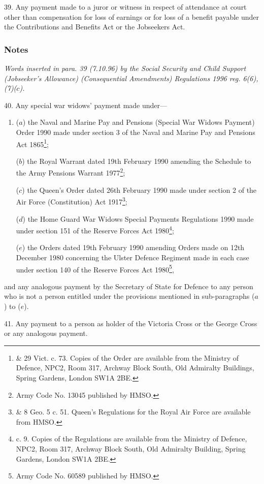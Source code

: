 \documentclass[a4paper]{article}
\newcommand\amendment[1]{\subsubsection*{Notes}{\itshape\frenchspacing\footnotesize #1 \par\goodbreak}}
\begin{document}
39.  Any payment made to a juror or witness in respect of attendance at court other than compensation for loss of earnings or for loss of a benefit payable under the Contributions and Benefits Act
or the Jobseekers Act.  %

\amendment{
Words inserted in para. 39 (7.10.96) by the Social Security and Child Support (Jobseeker's Allowance) (Consequential Amendments) Regulations 1996 reg. 6(6), (7)($c$).
}

\medskip

40.  Any special war widows' payment made under—
\begin{enumerate}\item[]
($a$) the Naval and Marine Pay and Pensions (Special War Widows Payment) Order 1990 made under section 3 of the Naval and Marine Pay and Pensions Act 1865\footnote{ \& 29 Vict. c. 73. Copies of the Order are available from the Ministry of Defence, NPC2, Room 317, Archway Block South, Old Admiralty Buildings, Spring Gardens, London SW1A 2BE.};

($b$) the Royal Warrant dated 19th February 1990 amending the Schedule to the Army Pensions Warrant 1977\footnote{\frenchspacing Army Code No. 13045 published by HMSO.};

($c$) the Queen’s Order dated 26th February 1990 made under section 2 of the Air Force (Constitution) Act 1917\footnote{ \& 8 Geo. 5 c. 51. Queen’s Regulations for the Royal Air Force are available from HMSO.};

($d$) the Home Guard War Widows Special Payments Regulations 1990 made under section 151 of the Reserve Forces Act 1980\footnote{ c. 9. Copies of the Regulations are available from the Ministry of Defence, NPC2, Room 317, Archway Block South, Old Admiralty Building, Spring Gardens, London SW1A 2BE.};

($e$) the Orders dated 19th February 1990 amending Orders made on 12th December 1980 concerning the Ulster Defence Regiment made in each case under section 140 of the Reserve Forces Act 1980\footnote{\frenchspacing Army Code No. 60589 published by HMSO.},
\end{enumerate}
and any analogous payment by the Secretary of State for Defence to any person who is not a person entitled under the provisions mentioned in sub-paragraphs ($a$) to ($e$).

\medskip

41.  Any payment to a person as holder of the Victoria Cross or the George Cross or any analogous payment.
\end{document}
